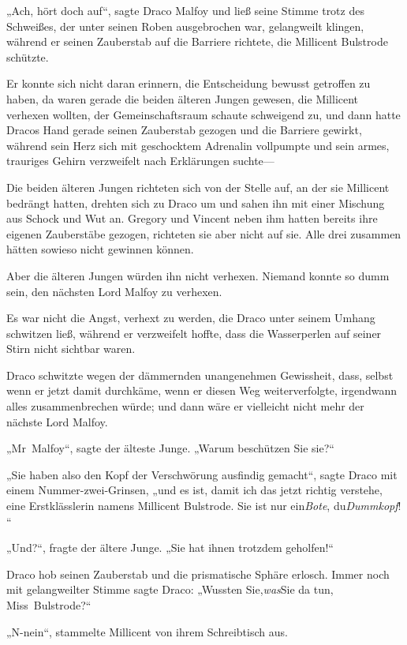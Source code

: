 {„Ach, hört doch auf“, sagte Draco Malfoy und ließ seine Stimme trotz des Schweißes, der unter seinen Roben ausgebrochen war, gelangweilt klingen, während er seinen Zauberstab auf die Barriere richtete, die Millicent Bulstrode schützte.

Er konnte sich nicht daran erinnern, die Entscheidung bewusst getroffen zu haben, da waren gerade die beiden älteren Jungen gewesen, die Millicent verhexen wollten, der Gemeinschaftsraum schaute schweigend zu, und dann hatte Dracos Hand gerade seinen Zauberstab gezogen und die Barriere gewirkt, während sein Herz sich mit geschocktem Adrenalin vollpumpte und sein armes, trauriges Gehirn verzweifelt nach Erklärungen suchte—

Die beiden älteren Jungen richteten sich von der Stelle auf, an der sie Millicent bedrängt hatten, drehten sich zu Draco um und sahen ihn mit einer Mischung aus Schock und Wut an. Gregory und Vincent neben ihm hatten bereits ihre eigenen Zauberstäbe gezogen, richteten sie aber nicht auf sie. Alle drei zusammen hätten sowieso nicht gewinnen können.

Aber die älteren Jungen würden ihn nicht verhexen. Niemand konnte so dumm sein, den nächsten Lord Malfoy zu verhexen.

Es war nicht die Angst, verhext zu werden, die Draco unter seinem Umhang schwitzen ließ, während er verzweifelt hoffte, dass die Wasserperlen auf seiner Stirn nicht sichtbar waren.

Draco schwitzte wegen der dämmernden unangenehmen Gewissheit, dass, selbst wenn er jetzt damit durchkäme, wenn er diesen Weg weiterverfolgte, irgendwann alles zusammenbrechen würde; und dann wäre er vielleicht nicht mehr der nächste Lord Malfoy.

„Mr~Malfoy“, sagte der älteste Junge. „Warum beschützen Sie sie?“

„Sie haben also den Kopf der Verschwörung ausfindig gemacht“, sagte Draco mit einem Nummer-zwei-Grinsen, „und es ist, damit ich das jetzt richtig verstehe, eine Erstklässlerin namens Millicent Bulstrode. Sie ist nur ein\emph{Bote}, du\emph{Dummkopf}! “

„Und?“, fragte der ältere Junge. „Sie hat ihnen trotzdem geholfen!“

Draco hob seinen Zauberstab und die prismatische Sphäre erlosch. Immer noch mit gelangweilter Stimme sagte Draco: „Wussten Sie,\emph{was}Sie da tun, Miss~Bulstrode?“

„N-nein“, stammelte Millicent von ihrem Schreibtisch aus.

}
